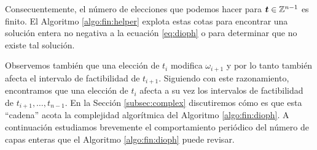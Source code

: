 Consecuentemente, el número de elecciones que podemos hacer para $\boldsymbol{t} \in \mathbb{Z}^{n-1}$ es finito.
El Algoritmo \ref{algo:fin:helper} explota estas cotas para encontrar una solución entera no
negativa a la ecuación \eqref{eq:dioph} o para determinar que no existe tal solución.

Observemos también que una elección de $t_i$ modifica $\omega_{i+1}$ y por lo tanto también afecta
el intervalo de factibilidad de $t_{i+1}$. Siguiendo con este razonamiento, encontramos que una
elección de $t_i$ afecta a su vez los intervalos de factibilidad de $t_{i+1}, \ldots, t_{n-1}$. En
la Sección \ref{subsec:complex} discutiremos cómo es que esta ``cadena'' acota la complejidad
algorítmica del Algoritmo \ref{algo:fin:dioph}. A continuación estudiamos brevemente el
comportamiento periódico del número de capas enteras que el Algoritmo \ref{algo:fin:dioph} puede
revisar.

